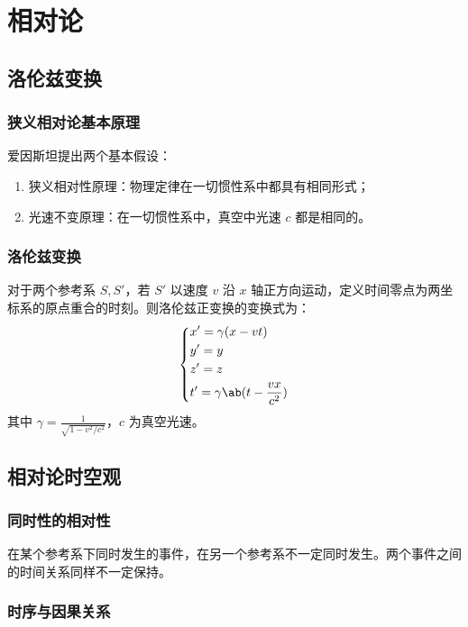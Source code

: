 \section{相对论}

\subsection{洛伦兹变换}

\subsubsection{狭义相对论基本原理}

爱因斯坦提出两个基本假设：

\begin{enumerate}
    \item 狭义相对性原理：物理定律在一切惯性系中都具有相同形式；
    \item 光速不变原理：在一切惯性系中，真空中光速 $c$ 都是相同的。
\end{enumerate}

\subsubsection{洛伦兹变换}

对于两个参考系 $S, S'$，若 $S'$ 以速度 $v$ 沿 $x$ 轴正方向运动，定义时间零点为两坐标系的原点重合的时刻。则洛伦兹正变换的变换式为：
$$
\begin{dcases}
    x' = \gamma (x - vt) \\
    y' = y \\
    z' = z \\
    t' = \gamma \ab(t - \frac{v x}{c^2}) \\
\end{dcases}
$$
其中 $\gamma = \frac{1}{\sqrt{1 - v^2 / c^2}}$，$c$ 为真空光速。

\subsection{相对论时空观}

\subsubsection{同时性的相对性}

在某个参考系下同时发生的事件，在另一个参考系不一定同时发生。两个事件之间的时间关系同样不一定保持。

\subsubsection{时序与因果关系}

